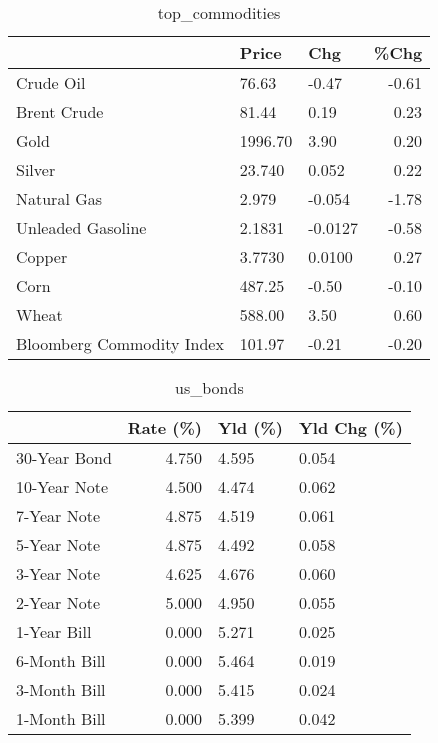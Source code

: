 \documentclass{article}%
\begin{document}
\begin{table}[htbp]%
\caption{top\_commodities}%
\centering%
\begin{adjustbox}{width=1\textwidth}%
\begin{tabular}{lllr}
\toprule
                          &   Price &     Chg &  \%Chg \\
\midrule
               Crude Oil  &   76.63 &   -0.47 & -0.61 \\
             Brent Crude  &   81.44 &    0.19 &  0.23 \\
                    Gold  & 1996.70 &    3.90 &  0.20 \\
                  Silver  &  23.740 &   0.052 &  0.22 \\
             Natural Gas  &   2.979 &  -0.054 & -1.78 \\
       Unleaded Gasoline  &  2.1831 & -0.0127 & -0.58 \\
                  Copper  &  3.7730 &  0.0100 &  0.27 \\
                    Corn  &  487.25 &   -0.50 & -0.10 \\
                   Wheat  &  588.00 &    3.50 &  0.60 \\
Bloomberg Commodity Index &  101.97 &   -0.21 & -0.20 \\
\bottomrule
\end{tabular}
%
\end{adjustbox}%
\end{table}

%


\begin{table}[htbp]%
\caption{us\_bonds}%
\centering%
\begin{adjustbox}{width=1\textwidth}%
\begin{tabular}{lrll}
\toprule
             &  Rate (\%) & Yld (\%) & Yld Chg (\%) \\
\midrule
30-Year Bond &     4.750 &   4.595 &       0.054 \\
10-Year Note &     4.500 &   4.474 &       0.062 \\
 7-Year Note &     4.875 &   4.519 &       0.061 \\
 5-Year Note &     4.875 &   4.492 &       0.058 \\
 3-Year Note &     4.625 &   4.676 &       0.060 \\
 2-Year Note &     5.000 &   4.950 &       0.055 \\
 1-Year Bill &     0.000 &   5.271 &       0.025 \\
6-Month Bill &     0.000 &   5.464 &       0.019 \\
3-Month Bill &     0.000 &   5.415 &       0.024 \\
1-Month Bill &     0.000 &   5.399 &       0.042 \\
\bottomrule
\end{tabular}
%
\end{adjustbox}%
\end{table}
\end{document}
